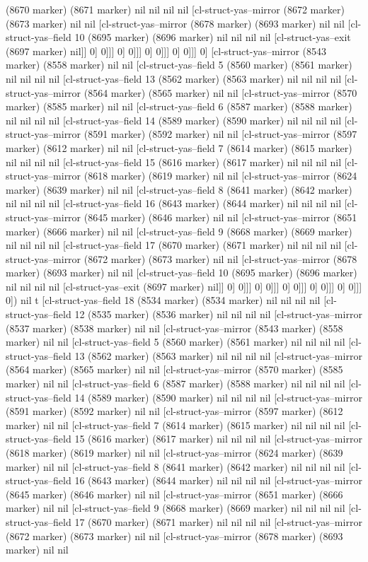 {{(8670 marker) (8671 marker) nil nil nil nil [cl-struct-yas--mirror (8672 marker) (8673 marker) nil nil [cl-struct-yas--mirror (8678 marker) (8693 marker) nil nil [cl-struct-yas--field 10 (8695 marker) (8696 marker) nil nil nil nil [cl-struct-yas--exit (8697 marker) nil]] 0] 0]]] 0] 0]]] 0] 0]]] 0] 0]]] 0] [cl-struct-yas--mirror (8543 marker) (8558 marker) nil nil [cl-struct-yas--field 5 (8560 marker) (8561 marker) nil nil nil nil [cl-struct-yas--field 13 (8562 marker) (8563 marker) nil nil nil nil [cl-struct-yas--mirror (8564 marker) (8565 marker) nil nil [cl-struct-yas--mirror (8570 marker) (8585 marker) nil nil [cl-struct-yas--field 6 (8587 marker) (8588 marker) nil nil nil nil [cl-struct-yas--field 14 (8589 marker) (8590 marker) nil nil nil nil [cl-struct-yas--mirror (8591 marker) (8592 marker) nil nil [cl-struct-yas--mirror (8597 marker) (8612 marker) nil nil [cl-struct-yas--field 7 (8614 marker) (8615 marker) nil nil nil nil [cl-struct-yas--field 15 (8616 marker) (8617 marker) nil nil nil nil [cl-struct-yas--mirror (8618 marker) (8619 marker) nil nil [cl-struct-yas--mirror (8624 marker) (8639 marker) nil nil [cl-struct-yas--field 8 (8641 marker) (8642 marker) nil nil nil nil [cl-struct-yas--field 16 (8643 marker) (8644 marker) nil nil nil nil [cl-struct-yas--mirror (8645 marker) (8646 marker) nil nil [cl-struct-yas--mirror (8651 marker) (8666 marker) nil nil [cl-struct-yas--field 9 (8668 marker) (8669 marker) nil nil nil nil [cl-struct-yas--field 17 (8670 marker) (8671 marker) nil nil nil nil [cl-struct-yas--mirror (8672 marker) (8673 marker) nil nil [cl-struct-yas--mirror (8678 marker) (8693 marker) nil nil [cl-struct-yas--field 10 (8695 marker) (8696 marker) nil nil nil nil [cl-struct-yas--exit (8697 marker) nil]] 0] 0]]] 0] 0]]] 0] 0]]] 0] 0]]] 0] 0]]] 0]) nil t [cl-struct-yas--field 18 (8534 marker) (8534 marker) nil nil nil nil [cl-struct-yas--field 12 (8535 marker) (8536 marker) nil nil nil nil [cl-struct-yas--mirror (8537 marker) (8538 marker) nil nil [cl-struct-yas--mirror (8543 marker) (8558 marker) nil nil [cl-struct-yas--field 5 (8560 marker) (8561 marker) nil nil nil nil [cl-struct-yas--field 13 (8562 marker) (8563 marker) nil nil nil nil [cl-struct-yas--mirror (8564 marker) (8565 marker) nil nil [cl-struct-yas--mirror (8570 marker) (8585 marker) nil nil [cl-struct-yas--field 6 (8587 marker) (8588 marker) nil nil nil nil [cl-struct-yas--field 14 (8589 marker) (8590 marker) nil nil nil nil [cl-struct-yas--mirror (8591 marker) (8592 marker) nil nil [cl-struct-yas--mirror (8597 marker) (8612 marker) nil nil [cl-struct-yas--field 7 (8614 marker) (8615 marker) nil nil nil nil [cl-struct-yas--field 15 (8616 marker) (8617 marker) nil nil nil nil [cl-struct-yas--mirror (8618 marker) (8619 marker) nil nil [cl-struct-yas--mirror (8624 marker) (8639 marker) nil nil [cl-struct-yas--field 8 (8641 marker) (8642 marker) nil nil nil nil [cl-struct-yas--field 16 (8643 marker) (8644 marker) nil nil nil nil [cl-struct-yas--mirror (8645 marker) (8646 marker) nil nil [cl-struct-yas--mirror (8651 marker) (8666 marker) nil nil [cl-struct-yas--field 9 (8668 marker) (8669 marker) nil nil nil nil [cl-struct-yas--field 17 (8670 marker) (8671 marker) nil nil nil nil [cl-struct-yas--mirror (8672 marker) (8673 marker) nil nil [cl-struct-yas--mirror (8678 marker) (8693 marker) nil nil }}

